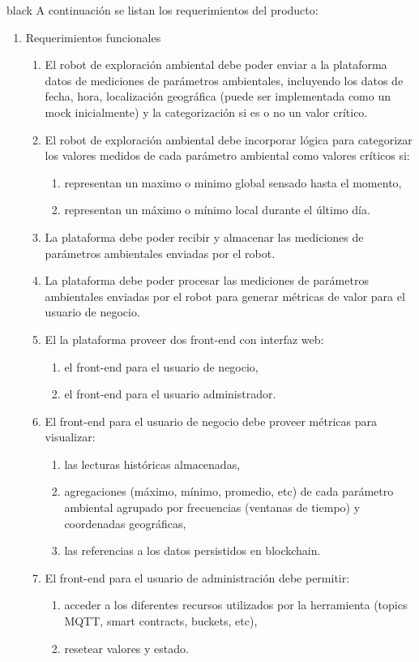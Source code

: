 \documentclass[
11pt, %
]{charter}
\begin{document}
\begin{consigna}{black}
A continuación se listan los requerimientos del producto:

\begin{enumerate}	
	\item Requerimientos funcionales		
	\begin{enumerate}	
		
		\item El robot de exploración ambiental debe poder enviar a la plataforma datos de mediciones de parámetros ambientales, incluyendo los datos de fecha, hora, localización geográfica (puede ser implementada como un mock inicialmente) y la categorización si es o no un valor crítico.
		\item El robot de exploración ambiental debe incorporar lógica para categorizar los valores medidos de cada parámetro ambiental como valores críticos si:
		\begin{enumerate}				
			\item representan un maximo o minimo global sensado hasta el momento,				
			\item representan un máximo o mínimo local durante el último día.				
		\end{enumerate}			
		\item La plataforma debe poder recibir y almacenar las mediciones de parámetros ambientales enviadas por el robot.
		\item La plataforma debe poder procesar las mediciones de parámetros ambientales enviadas por el robot para generar métricas de valor para el usuario de negocio.		
		\item El la plataforma proveer dos front-end con interfaz web:
			\begin{enumerate}				
				\item el front-end para el usuario de negocio,				
				\item el front-end para el usuario administrador.				
			\end{enumerate}			
		
		\item El front-end para el usuario de negocio debe proveer métricas para visualizar:
			\begin{enumerate}				
				\item las lecturas históricas almacenadas,				
				\item agregaciones (máximo, mínimo, promedio, etc) de cada parámetro ambiental agrupado por frecuencias (ventanas de tiempo) y coordenadas geográficas,				
				\item las referencias a los datos persistidos en blockchain.
			\end{enumerate}			
		\item El front-end para el usuario de administración debe permitir:
			\begin{enumerate}				
				\item acceder a los diferentes recursos utilizados por la herramienta (topics MQTT, smart contracts, buckets, etc),
				\item resetear valores y estado.			
			\end{enumerate}			
		\end{enumerate}	


\end{enumerate}
\end{consigna}
\end{document}
